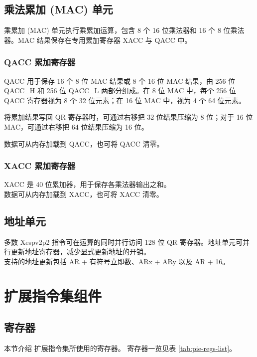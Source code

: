 \documentclass[main\_\_CN.tex]{subfiles}
\begin{document}
\subsection{乘法累加 (MAC) 单元}
乘累加 (MAC) 单元执行乘累加运算，包含 8 个 16 位乘法器和 16 个 8 位乘法器。MAC 结果保存在专用累加寄存器 XACC 与 QACC 中。

\subsubsection{QACC 累加寄存器}

QACC 用于保存 16 个 8 位 MAC 结果或 8 个 16 位 MAC 结果，由 256 位 QACC\_H 和 256 位 QACC\_L 两部分组成。在 8 位 MAC 中，每个 256 位 QACC 寄存器视为 8 个 32 位元素；在 16 位 MAC 中，视为 4 个 64 位元素。

将累加结果写回 QR 寄存器时，可通过右移把 32 位结果压缩为 8 位；对于 16 位 MAC，可通过右移把 64 位结果压缩为 16 位。

数据可从内存加载到 QACC，也可将 QACC 清零。

\subsubsection{XACC 累加寄存器}

XACC 是 40 位累加器，用于保存各乘法器输出之和。\\
数据可从内存加载到 XACC，也可将 XACC 清零。

\subsection{地址单元}

多数 Xespv2p2 指令可在运算的同时并行访问 128 位 QR 寄存器。地址单元可并行更新地址寄存器，减少显式更新地址的开销。\\
支持的地址更新包括 AR + 有符号立即数、ARx + ARy 以及 AR + 16。


\section{扩展指令集组件}

\subsection{寄存器}

本节介绍 \chipname{} 扩展指令集所使用的寄存器。
寄存器一览见表 \ref{tab:pie-regs-list}。


\end{document}
